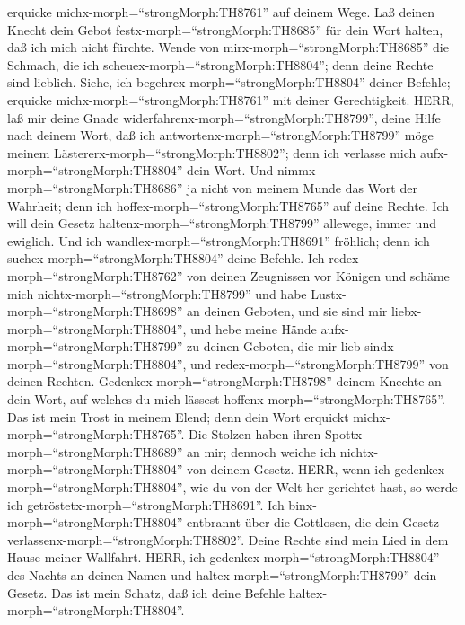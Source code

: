 erquicke michx-morph=``strongMorph:TH8761'' auf deinem Wege.
 Laß deinen Knecht dein Gebot
festx-morph=``strongMorph:TH8685'' für dein Wort halten, daß ich mich
nicht fürchte.  Wende von mirx-morph=``strongMorph:TH8685''
die Schmach, die ich scheuex-morph=``strongMorph:TH8804''; denn deine
Rechte sind lieblich.  Siehe, ich
begehrex-morph=``strongMorph:TH8804'' deiner Befehle; erquicke
michx-morph=``strongMorph:TH8761'' mit deiner Gerechtigkeit.
 HERR, laß mir deine Gnade
widerfahrenx-morph=``strongMorph:TH8799'', deine Hilfe nach deinem Wort,
 daß ich antwortenx-morph=``strongMorph:TH8799'' möge
meinem Lästererx-morph=``strongMorph:TH8802''; denn ich verlasse mich
aufx-morph=``strongMorph:TH8804'' dein Wort.  Und
nimmx-morph=``strongMorph:TH8686'' ja nicht von meinem Munde das Wort
der Wahrheit; denn ich hoffex-morph=``strongMorph:TH8765'' auf deine
Rechte.  Ich will dein Gesetz
haltenx-morph=``strongMorph:TH8799'' allewege, immer und ewiglich.
 Und ich wandlex-morph=``strongMorph:TH8691'' fröhlich;
denn ich suchex-morph=``strongMorph:TH8804'' deine Befehle.
 Ich redex-morph=``strongMorph:TH8762'' von deinen
Zeugnissen vor Königen und schäme mich
nichtx-morph=``strongMorph:TH8799''  und habe
Lustx-morph=``strongMorph:TH8698'' an deinen Geboten, und sie sind mir
liebx-morph=``strongMorph:TH8804'',  und hebe meine Hände
aufx-morph=``strongMorph:TH8799'' zu deinen Geboten, die mir lieb
sindx-morph=``strongMorph:TH8804'', und
redex-morph=``strongMorph:TH8799'' von deinen Rechten. 
Gedenkex-morph=``strongMorph:TH8798'' deinem Knechte an dein Wort, auf
welches du mich lässest hoffenx-morph=``strongMorph:TH8765''.
 Das ist mein Trost in meinem Elend; denn dein Wort
erquickt michx-morph=``strongMorph:TH8765''.  Die Stolzen
haben ihren Spottx-morph=``strongMorph:TH8689'' an mir; dennoch weiche
ich nichtx-morph=``strongMorph:TH8804'' von deinem Gesetz. 
HERR, wenn ich gedenkex-morph=``strongMorph:TH8804'', wie du von der
Welt her gerichtet hast, so werde ich
getröstetx-morph=``strongMorph:TH8691''.  Ich
binx-morph=``strongMorph:TH8804'' entbrannt über die Gottlosen, die dein
Gesetz verlassenx-morph=``strongMorph:TH8802''.  Deine
Rechte sind mein Lied in dem Hause meiner Wallfahrt.  HERR,
ich gedenkex-morph=``strongMorph:TH8804'' des Nachts an deinen Namen und
haltex-morph=``strongMorph:TH8799'' dein Gesetz.  Das ist
mein Schatz, daß ich deine Befehle haltex-morph=``strongMorph:TH8804''.
